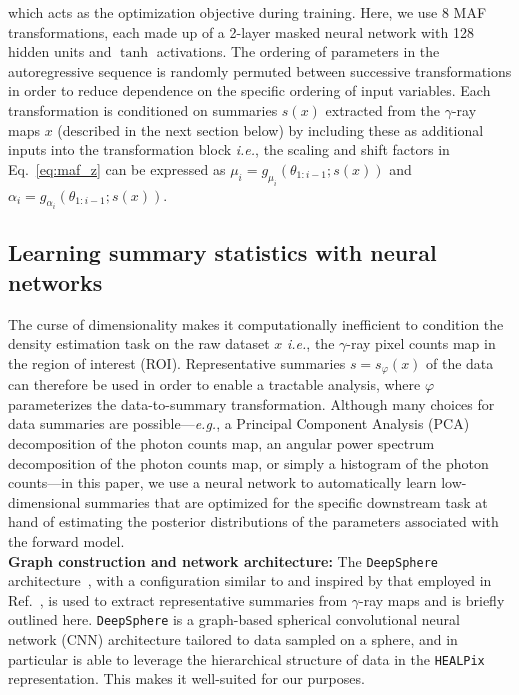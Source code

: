 \documentclass[prd,aps,10pt,nofootinbib,twocolumn,superscriptaddress,preprintnumbers,balancelastpage,longbibliography,floatfix]{revtex4-2}
\begin{document}
which acts as the optimization objective during training. Here, we use 8 MAF transformations, each made up of a 2-layer masked neural network with 128 hidden units and $\tanh$ activations. The ordering of parameters in the autoregressive sequence is randomly permuted between successive transformations in order to reduce dependence on the specific ordering of input variables. Each transformation is conditioned on summaries $s(x)$ extracted from the $\gamma$-ray maps $x$ (described in the next section below) by including these as additional inputs into the transformation block \emph{i.e.}, the scaling and shift factors in Eq.~\eqref{eq:maf_z} can be expressed as $\mu_{i}=g_{\mu_{i}}\left({\theta}_{1: i-1} ; {s(x)}\right)$ and $\alpha_i = g_{\alpha_{i}}\left({\theta}_{1: i-1} ; {s(x)}\right)$.

\subsection{Learning summary statistics with neural networks}

The curse of dimensionality makes it computationally inefficient to condition the density estimation task on the raw dataset $x$ \emph{i.e.}, the $\gamma$-ray pixel counts map in the region of interest (ROI). Representative summaries $s = s_\varphi(x)$ of the data can therefore be used in order to enable a tractable analysis, where $\varphi$ parameterizes the data-to-summary transformation. Although many choices for data summaries are possible---\emph{e.g.}, a Principal Component Analysis (PCA) decomposition of the photon counts map, an angular power spectrum decomposition of the photon counts map, or simply a histogram of the photon counts---in this paper, we use a neural network to automatically learn low-dimensional summaries that are optimized for the specific downstream task at hand of estimating the posterior distributions of the parameters associated with the forward model. \\

\noindent
\textbf{Graph construction and network architecture:}
The \texttt{DeepSphere} architecture~\cite{DBLP:conf/iclr/DefferrardMGP20,Perraudin:2018rbt,deepsphere_rlgm}, with a configuration similar to and inspired by that employed in Ref.~\cite{List:2020mzd}, is used to extract representative summaries from $\gamma$-ray maps and is briefly outlined here. \texttt{DeepSphere} is a graph-based spherical convolutional neural network (CNN) architecture tailored to data sampled on a sphere, and in particular is able to leverage the hierarchical structure of data in the \texttt{HEALPix} representation. This makes it well-suited for our purposes.
\end{document}
